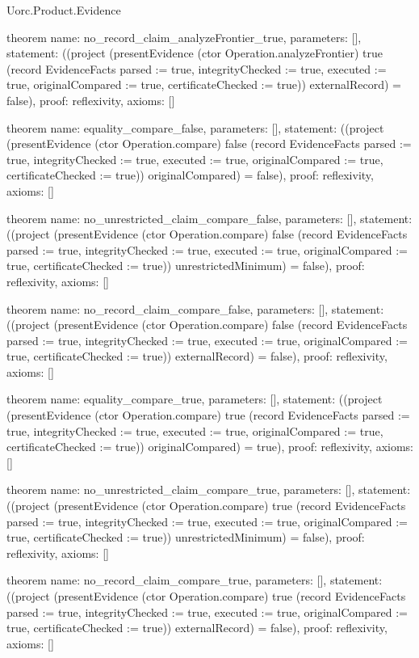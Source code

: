 \begin{lexlean}{Uorc.Product.Evidence}
\begin{semanticmodule}
theorem{
  name: no_record_claim_analyzeFrontier_true,
  parameters: [],
  statement: ((project (presentEvidence (ctor Operation.analyzeFrontier) true (record EvidenceFacts {parsed := true, integrityChecked := true, executed := true, originalCompared := true, certificateChecked := true})) externalRecord) = false),
  proof: reflexivity{},
  axioms: []
}

theorem{
  name: equality_compare_false,
  parameters: [],
  statement: ((project (presentEvidence (ctor Operation.compare) false (record EvidenceFacts {parsed := true, integrityChecked := true, executed := true, originalCompared := true, certificateChecked := true})) originalCompared) = false),
  proof: reflexivity{},
  axioms: []
}

theorem{
  name: no_unrestricted_claim_compare_false,
  parameters: [],
  statement: ((project (presentEvidence (ctor Operation.compare) false (record EvidenceFacts {parsed := true, integrityChecked := true, executed := true, originalCompared := true, certificateChecked := true})) unrestrictedMinimum) = false),
  proof: reflexivity{},
  axioms: []
}

theorem{
  name: no_record_claim_compare_false,
  parameters: [],
  statement: ((project (presentEvidence (ctor Operation.compare) false (record EvidenceFacts {parsed := true, integrityChecked := true, executed := true, originalCompared := true, certificateChecked := true})) externalRecord) = false),
  proof: reflexivity{},
  axioms: []
}

theorem{
  name: equality_compare_true,
  parameters: [],
  statement: ((project (presentEvidence (ctor Operation.compare) true (record EvidenceFacts {parsed := true, integrityChecked := true, executed := true, originalCompared := true, certificateChecked := true})) originalCompared) = true),
  proof: reflexivity{},
  axioms: []
}

theorem{
  name: no_unrestricted_claim_compare_true,
  parameters: [],
  statement: ((project (presentEvidence (ctor Operation.compare) true (record EvidenceFacts {parsed := true, integrityChecked := true, executed := true, originalCompared := true, certificateChecked := true})) unrestrictedMinimum) = false),
  proof: reflexivity{},
  axioms: []
}

theorem{
  name: no_record_claim_compare_true,
  parameters: [],
  statement: ((project (presentEvidence (ctor Operation.compare) true (record EvidenceFacts {parsed := true, integrityChecked := true, executed := true, originalCompared := true, certificateChecked := true})) externalRecord) = false),
  proof: reflexivity{},
  axioms: []
}


\end{semanticmodule}
\end{lexlean}
